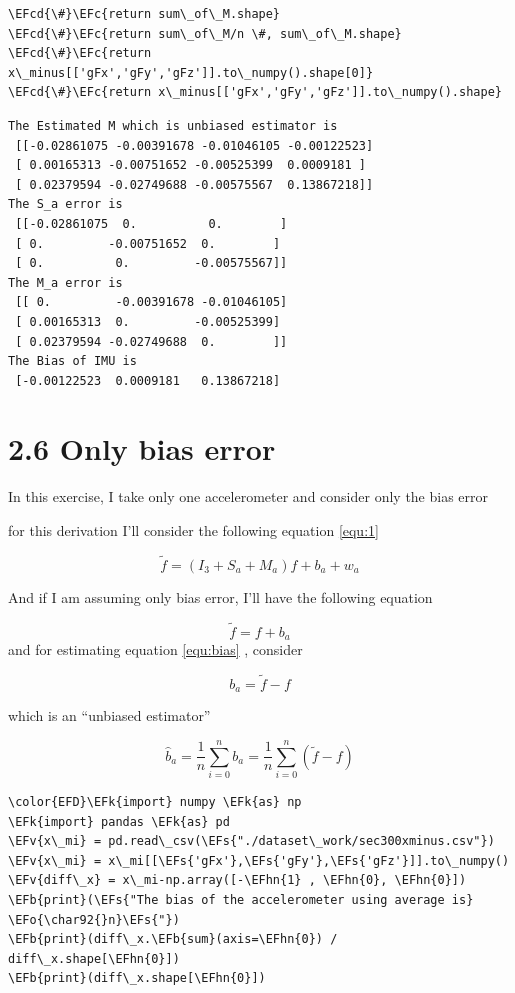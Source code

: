 \documentclass[11pt]{article}
\newcommand{\EFc}[1]{\textcolor{EFc}{#1}} %
\newcommand{\EFcd}[1]{\textcolor{EFcd}{#1}} %
\newcommand{\EFs}[1]{\textcolor{EFs}{#1}} %
\newcommand{\EFk}[1]{\textcolor{EFk}{#1}} %
\newcommand{\EFb}[1]{\textcolor{EFb}{#1}} %
\newcommand{\EFv}[1]{\textcolor{EFv}{#1}} %
\newcommand{\EFo}[1]{\textcolor{EFo}{#1}} %
\newcommand{\EFhn}[1]{\textcolor{EFhn}{#1}} %
\begin{document}
\begin{Code}
\begin{Verbatim}
\EFcd{\#}\EFc{return sum\_of\_M.shape}
\EFcd{\#}\EFc{return sum\_of\_M/n \#, sum\_of\_M.shape}
\EFcd{\#}\EFc{return  x\_minus[['gFx','gFy','gFz']].to\_numpy().shape[0]}
\EFcd{\#}\EFc{return x\_minus[['gFx','gFy','gFz']].to\_numpy().shape}
\end{Verbatim}
\end{Code}

\label{}
\begin{verbatim}
The Estimated M which is unbiased estimator is 
 [[-0.02861075 -0.00391678 -0.01046105 -0.00122523]
 [ 0.00165313 -0.00751652 -0.00525399  0.0009181 ]
 [ 0.02379594 -0.02749688 -0.00575567  0.13867218]]
The S_a error is 
 [[-0.02861075  0.          0.        ]
 [ 0.         -0.00751652  0.        ]
 [ 0.          0.         -0.00575567]]
The M_a error is 
 [[ 0.         -0.00391678 -0.01046105]
 [ 0.00165313  0.         -0.00525399]
 [ 0.02379594 -0.02749688  0.        ]]
The Bias of IMU is 
 [-0.00122523  0.0009181   0.13867218]
\end{verbatim}
\section{2.6 Only bias error}
\label{sec:org6139c86}
In this exercise, I take only one accelerometer and consider only the bias error

for this derivation I'll consider the following equation \ref{equ:1}

\begin{equation*}
\tilde{f} = (I_3+S_a+M_a)f+b_a+w_a 
\end{equation*}

And if I am assuming only bias error, I'll have the following equation


\begin{equation}\label{equ:bias}
\tilde{f} = f+b_a 
\end{equation}
and for estimating equation \ref{equ:bias} , consider

\begin{equation}
b_a = \tilde{f}-f 
\end{equation}

which is an ``unbiased estimator''

\begin{equation}
\hat{b}_a = \frac{1}{n} \sum_{i=0}^{n} b_a = \frac{1}{n} \sum_{i=0}^{n}(\tilde{f}-f )
\end{equation}




\begin{Code}
\begin{Verbatim}
\color{EFD}\EFk{import} numpy \EFk{as} np
\EFk{import} pandas \EFk{as} pd
\EFv{x\_mi} = pd.read\_csv(\EFs{"./dataset\_work/sec300xminus.csv"})
\EFv{x\_mi} = x\_mi[[\EFs{'gFx'},\EFs{'gFy'},\EFs{'gFz'}]].to\_numpy()
\EFv{diff\_x} = x\_mi-np.array([-\EFhn{1} , \EFhn{0}, \EFhn{0}])
\EFb{print}(\EFs{"The bias of the accelerometer using average is} \EFo{\char92{}n}\EFs{"})
\EFb{print}(diff\_x.\EFb{sum}(axis=\EFhn{0}) / diff\_x.shape[\EFhn{0}])
\EFb{print}(diff\_x.shape[\EFhn{0}])
\end{Verbatim}
\end{Code}
\end{document}
